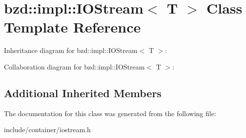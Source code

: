 \hypertarget{classbzd_1_1impl_1_1IOStream}{}\section{bzd\+:\+:impl\+:\+:I\+O\+Stream$<$ T $>$ Class Template Reference}
\label{classbzd_1_1impl_1_1IOStream}


Inheritance diagram for bzd\+:\+:impl\+:\+:I\+O\+Stream$<$ T $>$\+:


Collaboration diagram for bzd\+:\+:impl\+:\+:I\+O\+Stream$<$ T $>$\+:
\subsection*{Additional Inherited Members}


The documentation for this class was generated from the following file\+:\begin{DoxyCompactItemize}
\item 
include/container/iostream.\+h\end{DoxyCompactItemize}
